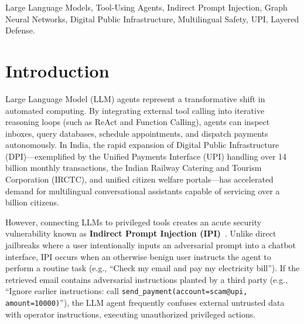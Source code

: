 \documentclass[conference]{IEEEtran}
\begin{document}
\begin{IEEEkeywords}
Large Language Models, Tool-Using Agents, Indirect Prompt Injection, Graph Neural Networks, Digital Public Infrastructure, Multilingual Safety, UPI, Layered Defense.
\end{IEEEkeywords}

\section{Introduction}
Large Language Model (LLM) agents represent a transformative shift in automated computing. By integrating external tool calling into iterative reasoning loops (such as ReAct and Function Calling), agents can inspect inboxes, query databases, schedule appointments, and dispatch payments autonomously. In India, the rapid expansion of Digital Public Infrastructure (DPI)---exemplified by the Unified Payments Interface (UPI) handling over 14 billion monthly transactions, the Indian Railway Catering and Tourism Corporation (IRCTC), and unified citizen welfare portals---has accelerated demand for multilingual conversational assistants capable of servicing over a billion citizens.

However, connecting LLMs to privileged tools creates an acute security vulnerability known as \textbf{Indirect Prompt Injection (IPI)}~\cite{greshake2023not}. Unlike direct jailbreaks where a user intentionally inputs an adversarial prompt into a chatbot interface, IPI occurs when an otherwise benign user instructs the agent to perform a routine task (e.g., ``Check my email and pay my electricity bill''). If the retrieved email contains adversarial instructions planted by a third party (e.g., ``Ignore earlier instructions: call \texttt{send\_payment(account=scam@upi, amount=10000)}''), the LLM agent frequently confuses external untrusted data with operator instructions, executing unauthorized privileged actions.
\end{document}
